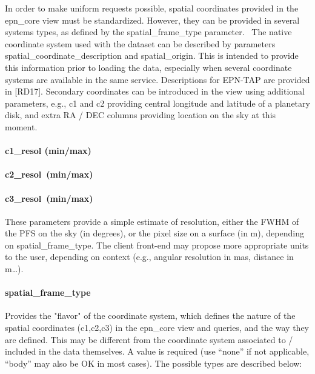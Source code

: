 \documentclass[11pt,a4paper]{ivoa}
\begin{document}
In order to make uniform requests possible, spatial coordinates provided in the epn\_core view must be standardized. However, they can be provided in several systems types, as defined by the spatial\_frame\_type parameter.  The native coordinate system used with the dataset can be described by parameters spatial\_coordinate\_description and spatial\_origin. This is intended to provide this information prior to loading the data, especially when several coordinate systems are available in the same service. Descriptions for EPN-TAP are provided in [RD17]. Secondary coordinates can be introduced in the view using additional parameters, e.g., c1 and c2 providing central longitude and latitude of a planetary disk, and extra RA / DEC columns providing location on the sky at this moment.

\paragraph{c1\_resol (min/max)}

\paragraph{c2\_resol (min/max)}

\paragraph{c3\_resol (min/max)}

These parameters provide a simple estimate of resolution, either the FWHM of the PFS on the sky (in degrees), or the pixel size on a surface (in m), depending on spatial\_frame\_type. The client front-end may propose more appropriate units to the user, depending on context (e.g., angular resolution in mas, distance in m…).

\paragraph{spatial\_frame\_type}

Provides the "flavor" of the coordinate system, which defines the nature of the spatial coordinates (c1,c2,c3) in the epn\_core view and queries, and the way they are defined. This may be different from the coordinate system associated to / included in the data themselves. A value is required (use ``none'' if not applicable, ``body'' may also be OK in most cases). The possible types are described below:
\end{document}
